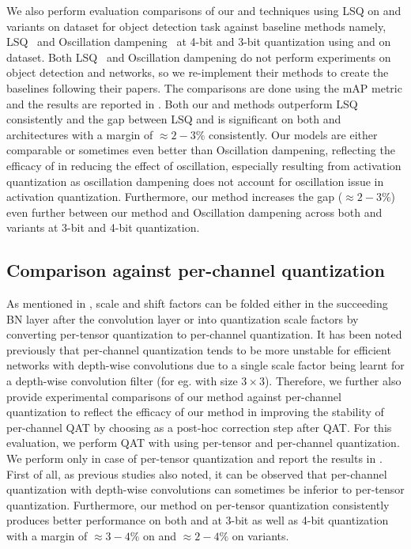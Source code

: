 We also perform evaluation comparisons of our \exma{} and \qc{} techniques using \acrshort{LSQ} \cite{lsq} on \yoloa{} and \yolob{} variants on \coco{} dataset for object detection task against baseline methods namely, LSQ~\cite{lsq} and Oscillation dampening~\cite{nagel2022overcoming} at 4-bit and 3-bit quantization using \yoloa{} and \yolob{} on \coco{} dataset. Both \acrshort{LSQ}~\cite{lsq} and Oscillation dampening do not perform experiments on object detection and \yolo{} networks, so we re-implement their methods to create the baselines following their papers. The comparisons are done using the mAP metric and the results are reported in . Both our \exma{} and \qc{} methods outperform \acrshort{LSQ} consistently and the gap between \acrshort{LSQ} and \qc{} is significant on both \yoloa{} and \yolob{} architectures with a margin of $\approx2-3\%$ consistently. Our \exma{} models are either comparable or sometimes even better than Oscillation dampening, reflecting the efficacy of \exma{} in reducing the effect of oscillation, especially resulting from activation quantization as oscillation dampening does not account for oscillation issue in activation quantization. Furthermore, our \qc{} method increases the gap ($\approx 2-3\%$) even further between our method and Oscillation dampening across both \yoloa{} and \yolob{} variants at 3-bit and 4-bit quantization.

\subsection{Comparison against per-channel quantization}


As mentioned in , \qc{} scale and shift factors can be folded either in the succeeding \acrfull{BN} layer after the convolution layer or into quantization scale factors by converting per-tensor quantization to per-channel quantization. It has been noted previously that per-channel quantization tends to be more unstable \cite{whitepaper} for efficient networks with depth-wise convolutions due to a single scale factor being learnt for a depth-wise convolution filter (for eg. with size $3 \times 3$). Therefore, we further also provide experimental comparisons of our \qc{} method against per-channel quantization to reflect the efficacy of our method in improving the stability of per-channel \acrshort{QAT} by choosing \qc{} as a post-hoc correction step after \acrshort{QAT}. For this evaluation, we perform \acrshort{QAT} with \exma{} using per-tensor and per-channel quantization. We perform \qc{} only in case of per-tensor quantization and report the results in . First of all, as previous studies also noted, it can be observed that per-channel quantization with depth-wise convolutions can sometimes be inferior to per-tensor quantization. Furthermore, our \qc{} method on per-tensor quantization consistently produces better performance on both \yoloa{} and \yolob{} at 3-bit as well as 4-bit quantization with a margin of $\approx 3-4\%$ on \yolob and $\approx 2-4\%$ on \yoloa{} variants.


